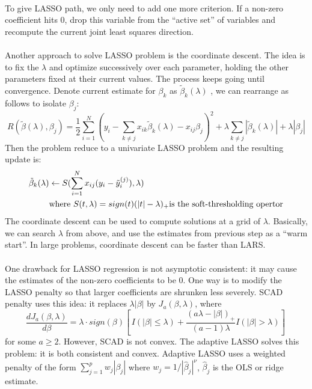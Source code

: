 \documentclass[]{article}
\begin{document}
\\
To give LASSO path, we only need to add one more criterion. If a non-zero coefficient hits 0, drop this variable from the “active set” of variables and recompute the current joint least squares direction.\\
\\
Another approach to solve LASSO problem is the coordinate descent. The idea is to fix the $\lambda$ and
optimize successively over each parameter, holding the other parameters fixed at their current values. The process keeps going until convergence. Denote current estimate for $\beta_k$ as $\tilde{\beta}_k(\lambda)$ , we can rearrange as follows to isolate $\beta_j$:
\begin{equation}
	R(\tilde{\beta}(\lambda), \beta_j) =   \frac{1}{2}\sum_{i=1}^{N}(y_i-\sum_{k \ne j}x_{ik}\tilde{\beta}_k(\lambda) - x_{ij}\beta_j)^2 + \lambda\sum_{k \ne j}|\tilde{\beta}_k(\lambda)| + \lambda |\beta_j|
\end{equation}
Then the problem reduce to a univariate LASSO problem and the resulting update is:
\begin{align}
	\tilde{\beta}_k(\lambda) &\gets S(\sum_{i=1}^{N}x_{ij}(y_i- \tilde{y}_i^{(j)}), \lambda)\\
	&\text{where } 
	S(t, \lambda)=sign(t)(|t|-\lambda)_{+} \text{is the soft-thresholding opertor} \notag
\end{align}
The coordinate descent can be used to compute solutions at a grid of $\lambda$. Basically, we can search $\lambda$ from above, and use the estimates from previous step as a “warm start”. In large problems, coordinate descent can be faster than LARS.\\
\\
One drawback for LASSO regression is not asymptotic consistent: it may cause the estimates of the non-zero coefficients to be 0. One way is to modify the LASSO penalty so that larger coefficients are shrunken less severely. SCAD penalty uses this idea: it replaces $\lambda |\beta|$ by $J_a (\beta, \lambda)$, where
\begin{equation}
	\frac{dJ_a(\beta, \lambda)}{d\beta}=\lambda\cdot sign(\beta)[ \,I(|\beta|\leq\lambda) + \frac{(a\lambda-|\beta|)_{+}}{(a-1)\lambda}I(|\beta| > \lambda)] \,
\end{equation}
for some $a\geq 2$. However, SCAD is not convex. The adaptive LASSO solves this problem: it is both consistent and convex. Adaptive LASSO uses a weighted penalty of the form $\sum_{j=1}^{p}w_j|\beta_j|$ where $w_j=1/|\hat{\beta}_j|^{\nu}$, $\hat{\beta}_j$ is the OLS or ridge estimate.\\
\\
\end{document}
